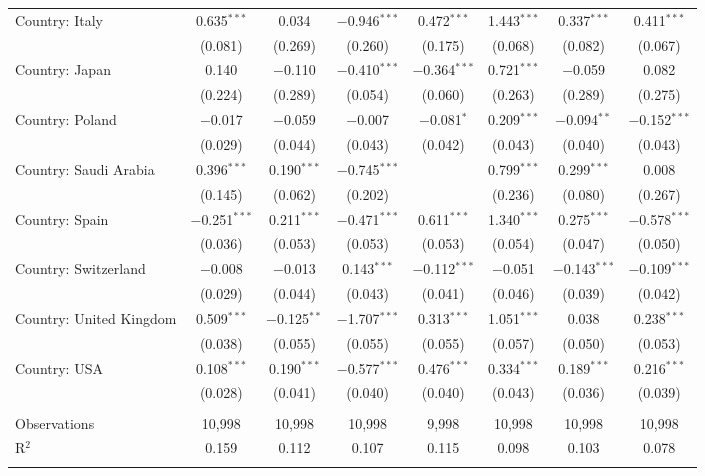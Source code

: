 \begin{tabular}{@{\extracolsep{5pt}}lccccccc}
  Country: Italy & 0.635$^{***}$ & 0.034 & $-$0.946$^{***}$ & 0.472$^{***}$ & 1.443$^{***}$ & 0.337$^{***}$ & 0.411$^{***}$ \\ 
  & (0.081) & (0.269) & (0.260) & (0.175) & (0.068) & (0.082) & (0.067) \\ 
  Country: Japan & 0.140 & $-$0.110 & $-$0.410$^{***}$ & $-$0.364$^{***}$ & 0.721$^{***}$ & $-$0.059 & 0.082 \\ 
  & (0.224) & (0.289) & (0.054) & (0.060) & (0.263) & (0.289) & (0.275) \\ 
  Country: Poland & $-$0.017 & $-$0.059 & $-$0.007 & $-$0.081$^{*}$ & 0.209$^{***}$ & $-$0.094$^{**}$ & $-$0.152$^{***}$ \\ 
  & (0.029) & (0.044) & (0.043) & (0.042) & (0.043) & (0.040) & (0.043) \\ 
  Country: Saudi Arabia & 0.396$^{***}$ & 0.190$^{***}$ & $-$0.745$^{***}$ &  & 0.799$^{***}$ & 0.299$^{***}$ & 0.008 \\ 
  & (0.145) & (0.062) & (0.202) &  & (0.236) & (0.080) & (0.267) \\ 
  Country: Spain & $-$0.251$^{***}$ & 0.211$^{***}$ & $-$0.471$^{***}$ & 0.611$^{***}$ & 1.340$^{***}$ & 0.275$^{***}$ & $-$0.578$^{***}$ \\ 
  & (0.036) & (0.053) & (0.053) & (0.053) & (0.054) & (0.047) & (0.050) \\ 
  Country: Switzerland & $-$0.008 & $-$0.013 & 0.143$^{***}$ & $-$0.112$^{***}$ & $-$0.051 & $-$0.143$^{***}$ & $-$0.109$^{***}$ \\ 
  & (0.029) & (0.044) & (0.043) & (0.041) & (0.046) & (0.039) & (0.042) \\ 
  Country: United Kingdom & 0.509$^{***}$ & $-$0.125$^{**}$ & $-$1.707$^{***}$ & 0.313$^{***}$ & 1.051$^{***}$ & 0.038 & 0.238$^{***}$ \\ 
  & (0.038) & (0.055) & (0.055) & (0.055) & (0.057) & (0.050) & (0.053) \\ 
  Country: USA & 0.108$^{***}$ & 0.190$^{***}$ & $-$0.577$^{***}$ & 0.476$^{***}$ & 0.334$^{***}$ & 0.189$^{***}$ & 0.216$^{***}$ \\ 
  & (0.028) & (0.041) & (0.040) & (0.040) & (0.043) & (0.036) & (0.039) \\ 
 \hline \\[-1.8ex] 

Observations & 10,998 & 10,998 & 10,998 & 9,998 & 10,998 & 10,998 & 10,998 \\ 
R$^{2}$ & 0.159 & 0.112 & 0.107 & 0.115 & 0.098 & 0.103 & 0.078 \\ 
\hline 
\hline \\[-1.8ex] 
\end{tabular} 